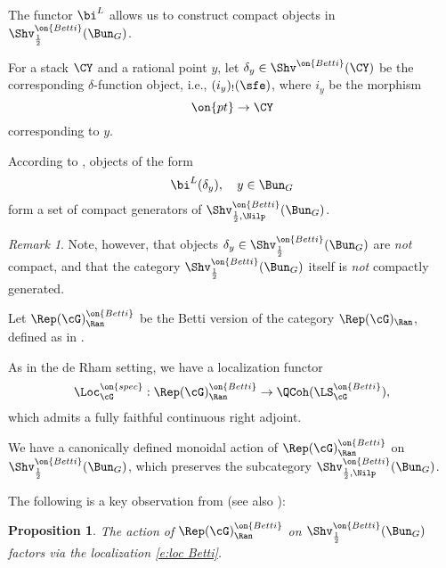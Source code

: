 \documentclass[9pt]{amsart}
\newtheorem{prop}[subsubsection]{Proposition}
\theoremstyle{remark}
\newtheorem{rem}[subsubsection]{Remark}
\theoremstyle{definition}
\theoremstyle{remark}
\numberwithin{equation}{section}
\begin{document}
The functor $\bi^L$ allows us to construct compact objects in $\Shv^{\on{Betti}}_{\frac{1}{2}}(\Bun_G)$.

\medskip

For a stack $\CY$ and a rational point $y$, let $\delta_y\in \Shv^{\on{Betti}}(\CY)$ be the corresponding
$\delta$-function object, i.e., $(i_y)_!(\sfe)$, where $i_y$ be the morphism
$$\on{pt}\to \CY$$
corresponding to $y$.

\medskip 

According to \cite[Proposition G.3.5]{AGKRRV}, objects of the form 
$$\bi^L(\delta_y), \quad y\in \Bun_G$$
form a set of compact generators of 
$\Shv^{\on{Betti}}_{\frac{1}{2},\Nilp}(\Bun_G)$.

\begin{rem}
Note, however, that objects $\delta_y\in \Shv^{\on{Betti}}_{\frac{1}{2}}(\Bun_G)$ are \emph{not}
compact, and that the category $\Shv^{\on{Betti}}_{\frac{1}{2}}(\Bun_G)$ itself is \emph{not} compactly generated.
\end{rem} 


\sssec{}

Let $\Rep(\cG)^{\on{Betti}}_\Ran$ be the Betti version of the category $\Rep(\cG)_\Ran$, defined as in 
\cite[Remark 11.1.10]{AGKRRV}. 

\medskip

As in the de Rham setting, we have a localization functor
\begin{equation} \label{e:loc Betti}
\Loc_\cG^{\on{spec}}:\Rep(\cG)^{\on{Betti}}_\Ran\to \QCoh(\LS^{\on{Betti}}_\cG),
\end{equation} 
which admits a fully faithful continuous right adjoint.

\sssec{}

We have a canonically defined monoidal action of $\Rep(\cG)^{\on{Betti}}_\Ran$ on $\Shv^{\on{Betti}}_{\frac{1}{2}}(\Bun_G)$,
which preserves the subcategory
$\Shv^{\on{Betti}}_{\frac{1}{2},\Nilp}(\Bun_G)$.

\medskip

The following is a key observation from \cite{NY} (see also \cite[Theorem 18.1.4]{AGKRRV}):

\begin{prop}
The action of $\Rep(\cG)^{\on{Betti}}_\Ran$ on $\Shv^{\on{Betti}}_{\frac{1}{2}}(\Bun_G)$ 
factors via the localization \eqref{e:loc Betti}. 
\end{prop}
\end{document}
